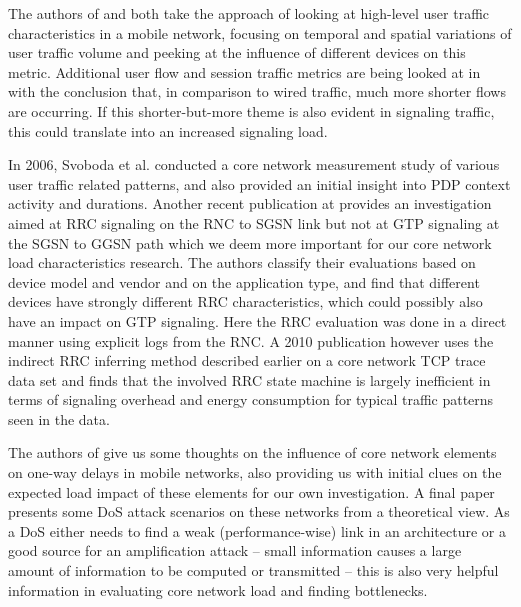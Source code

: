 The authors of \cite{shafiq2011characterizing} and \cite{paul2011understanding} both take the approach of looking at high-level user traffic characteristics in a mobile network, focusing on temporal and spatial variations of user traffic volume and peeking at the influence of different devices on this metric. Additional user flow and session traffic metrics are being looked at in \cite{Zhang:2012:UCC:2377677.2377764} with the conclusion that, in comparison to wired traffic, much more shorter flows are occurring. If this shorter-but-more theme is also evident in signaling traffic, this could translate into an increased signaling load.

In 2006, Svoboda et al. \cite{svoboda2006composition} conducted a core network measurement study of various user traffic related patterns, and also provided an initial insight into \gls{PDP} context activity and durations. Another recent publication at \cite{he2012panoramic} provides an investigation aimed at \gls{RRC} signaling on the \gls{RNC} to \gls{SGSN} link but not at \gls{GTP} signaling at the \gls{SGSN} to \gls{GGSN} path which we deem more important for our core network load characteristics research. The authors classify their evaluations based on device model and vendor and on the application type, and find that different devices have strongly different \gls{RRC} characteristics, which could possibly also have an impact on \gls{GTP} signaling. Here the \gls{RRC} evaluation was done in a direct manner using explicit logs from the \gls{RNC}. A 2010 publication\cite{Qian:2010:CRR:1879141.1879159} however uses the indirect \gls{RRC} inferring method described earlier on a core network TCP trace data set and finds that the involved \gls{RRC} state machine is largely inefficient in terms of signaling overhead and energy consumption for typical traffic patterns seen in the data.

The authors of \cite{4675847} give us some thoughts on the influence of core network elements on one-way delays in mobile networks, also providing us with initial clues on the expected load impact of these elements for our own investigation. A final paper \cite{Ricciato2010551} presents some \gls{DoS} attack scenarios on these networks from a theoretical view. As a \gls{DoS} either needs to find a weak (performance-wise) link in an architecture or a good source for an amplification attack -- small information causes a large amount of information to be computed or transmitted -- this is also very helpful information in evaluating core network load and finding bottlenecks.

